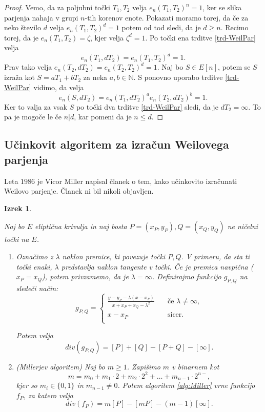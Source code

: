 \documentclass[12pt,a4paper,twoside]{article}
\theoremstyle{definition} %
\theoremstyle{plain} %
\newtheorem{izrek}[definicija]{Izrek}
\numberwithin{equation}{section}  %
\newcommand{\N}{\mathbb N}
\begin{document}
\begin{proof}
Vemo, da za poljubni točki $T_1,T_2$ velja $e_n(T_1,T_2)^n = 1$, ker se slika parjenja nahaja v grupi $n$-tih korenov enote. Pokazati moramo torej, da če za neko število $d$ velja  $e_n(T_1,T_2)^d = 1$ potem od tod sledi, da je $d \geq n$.
Recimo torej, da je $e_n(T_1,T_2) = \zeta$, kjer velja $\zeta^d = 1$.
Po točki ena trditve \ref{trd-WeilPar} velja $$e_n(T_1,dT_2) = e_n(T_1,T_2)^d=1.$$ Prav tako velja $e_n(T_2,dT_2) = e_n(T_2,T_2)^d = 1 $. Naj bo $S \in E[n]$, potem se $S$ izraža kot $S = aT_1+bT_2$ za neka $a,b \in \N$.
S ponovno uporabo trditve \ref{trd-WeilPar} vidimo, da velja
$$e_n(S,dT_2)= e_n(T_1,dT_2)^ae_n(T_2,dT_2)^b = 1. $$
Ker to valja za vsak $S$ po točki dva trditve \ref{trd-WeilPar} sledi, da je $dT_2 = \infty$. To pa je mogoče le če $n|d$, kar pomeni da je $n \leq d$.
\end{proof}

\subsection{Učinkovit algoritem za izračun Weilovega parjenja}

Leta $1986$ je Vicor Miller napisal članek o tem, kako učinkovito izračunati Weilovo parjenje. Članek ni bil nikoli objavljen.

\begin{izrek}
\label{izrek:Miller}

Naj bo $E$ eliptična krivulja in naj bosta $P=(x_P,y_P), Q = (x_Q,y_Q)$ ne ničelni točki na $E$.
\begin{enumerate}
\item Označimo z $\lambda$ naklon premice, ki povezuje točki $P,Q$. V primeru, da sta ti točki enaki, $\lambda$ predstavlja naklon tangente v točki. Če je premica navpična ($x_P = x_Q$), potem privzamemo, da je $\lambda = \infty$. Definirajmo funkcijo $g_{P,Q}$ na sledeči način:
\[ g_{P,Q} =
\begin{cases}
\frac{y-y_P-\lambda(x-x_P)}{x+x_P+x_Q-\lambda^2} & \quad \text{če } \lambda \neq \infty ,\\
x-x_P & \quad \text{sicer} .\\
\end{cases}
\]

Potem velja 
$$div(g_{P,Q}) = [P] + [Q] - [P+Q] - [\infty].$$


\item (Millerjev algoritem) Naj bo $m \geq 1$. Zapišimo $m$ v binarnem kot
$$m = m_0+m_1\cdot 2 + m_2\cdot 2^2 + \ldots + m_{n-1}\cdot 2^{n-},$$
kjer so $m_i \in \{ 0,1 \}$ in $m_{n-1} \neq 0$. Potem algoritem \ref{alg:Miller} vrne
funkcijo $f_P$, za katero velja
$$div(f_P) = m[P]-[mP]-(m-1)[\infty].$$ 


\end{enumerate}


\end{izrek}
\end{document}

